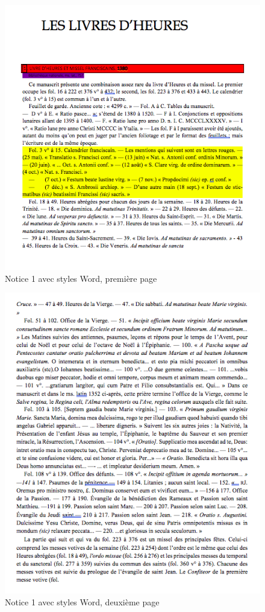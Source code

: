 \documentclass[a4paper,12pt,twoside]{book}
\begin{document}
	\begin{figure}[!h]
    \centering
    \includegraphics[width=15cm]{img/Doc_Sources_transformation/Docs_Word_Styles/Notice1/StylesNotice1_1.png}
    \caption{Notice 1 avec styles Word, première page}
    \end{figure}
    
    \begin{figure}[!h]
    \centering
    \includegraphics[width=15cm]{img/Doc_Sources_transformation/Docs_Word_Styles/Notice1/StylesNotice1_2.png}
    \caption{Notice 1 avec styles Word, deuxième page}
    \end{figure}
    \clearpage
    
\end{document}
